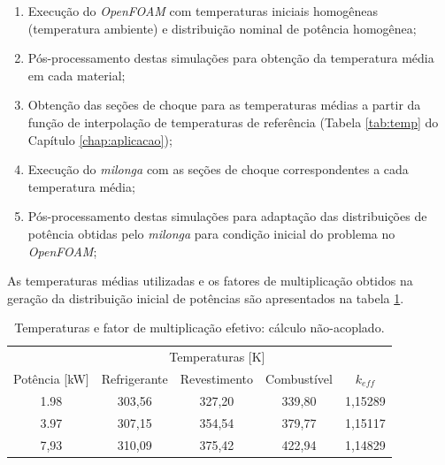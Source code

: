 \begin{enumerate}
\item Execução do \textit{OpenFOAM} com temperaturas iniciais homogêneas (temperatura ambiente) e distribuição nominal de potência homogênea;
\item Pós-processamento destas simulações para obtenção da temperatura média em cada material; %
\item Obtenção das seções de choque para as temperaturas médias a partir da função de interpolação de temperaturas
  de referência (Tabela \ref{tab:temp} do Capítulo \ref{chap:aplicacao});
\item Execução do \textit{milonga} com as seções de choque correspondentes a cada temperatura média;
\item Pós-processamento destas simulações para adaptação das distribuições de potência obtidas pelo \textit{milonga}
  para condição inicial do problema no \textit{OpenFOAM};
\end{enumerate}

As temperaturas médias utilizadas e os fatores de multiplicação obtidos na geração da distribuição inicial
de potências são apresentados na tabela \ref{tab:temp-keff}.

\begin{table}[htb]
  \centering
\caption{Temperaturas e fator de multiplicação efetivo: cálculo não-acoplado.}
\label{tab:temp-keff}
\begin{tabular}{ccccc}
\multicolumn{1}{l}{}         & \multicolumn{3}{c}{Temperaturas [K]}                                                                      & \multicolumn{1}{l}{}     \\ \cline{2-4}
\multicolumn{1}{c}{Potência [kW]} & \multicolumn{1}{c}{Refrigerante} & \multicolumn{1}{c}{Revestimento} & \multicolumn{1}{c}{Combustível} & \multicolumn{1}{c}{$k_{eff}$} \\ \hline
1.98                      & 303,56                         & 327,20                         & 339,80                        & 1,15289                  \\ \hline
3.97                      & 307,15                         & 354,54                         & 379,77                        & 1,15117                  \\ \hline
7,93                      & 310,09                         & 375,42                         & 422,94                        & 1,14829                 
\end{tabular}
\end{table}

